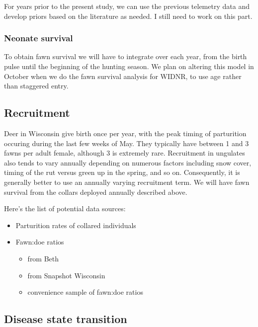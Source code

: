 \documentclass[12pt]{article}\usepackage[]{graphicx}\usepackage[]{color}
\begin{document}
For years prior to the present study, we can use the previous telemetry data and develop priors based on the literature as needed. I still need to work on this part.

\subsubsection{Neonate survival}

To obtain fawn survival we will have to integrate over each year, from the birth pulse until the beginning of the hunting season. We plan on altering this model in October when we do the fawn survival analysis for WIDNR, to use age rather than staggered entry.

\subsection{Recruitment}

Deer in Wisconsin give birth once per year, with the peak timing of parturition occuring during the last few weeks of May. They typically have between 1 and 3 fawns per adult female, although 3 is extremely rare. Recruitment in ungulates also tends to vary annually depending on numerous factors including snow cover, timing of the rut versus green up in the spring, and so on. Consequently, it is generally better to use an annually varying recruitment term. We will have fawn survival from the collars deployed annually described above.

Here's the list of potential data sources:
\begin{itemize}
\item  Parturition rates of collared individuals
\item	Fawn:doe ratios
\begin{itemize}
\item		from Beth
\item		from Snapshot Wisconsin
\item		convenience sample of fawn:doe ratios
\end{itemize}
\end{itemize}

\subsection{Disease state transition}
\end{document}
